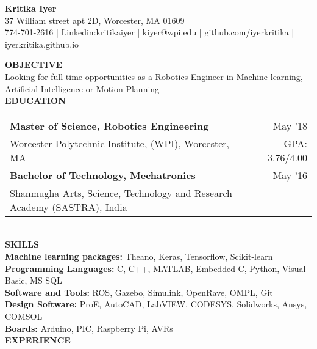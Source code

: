 \documentclass[10pt,a4paper]{article}
\begin{document}
\begin{center}

\textbf{\Large{Kritika Iyer}}\\
37 William street apt 2D, Worcester, MA 01609\\
774-701-2616 | Linkedin:kritikaiyer | kiyer@wpi.edu | github.com/iyerkritika | iyerkritika.github.io\\
\end{center}
\textbf{OBJECTIVE} \\
Looking for full-time opportunities as a Robotics Engineer in Machine learning, Artificial Intelligence or Motion Planning\\[1\baselineskip]
\textbf{EDUCATION}\\
\begin{tabular}{p{} r}
\textbf{Master of Science, Robotics Engineering} & May '18 \\
Worcester Polytechnic Institute, (WPI), Worcester, MA & GPA: 3.76/4.00 \\[1ex]
\textbf{Bachelor of Technology, Mechatronics} & May '16 \\
Shanmugha Arts, Science, Technology  and Research Academy (SASTRA), India
\end{tabular}
\\[1\baselineskip]
\textbf{SKILLS}\\
\textbf{Machine learning packages:} Theano, Keras, Tensorflow, Scikit-learn\\
\textbf{Programming Languages:} C, C++, MATLAB, Embedded C, Python, Visual Basic, MS SQL\\
\textbf{Software and Tools:} ROS, Gazebo, Simulink, OpenRave, OMPL, Git\\
\textbf{Design Software:} ProE, AutoCAD, LabVIEW, CODESYS, Solidworks, Ansys, COMSOL\\
\textbf{Boards:} Arduino, PIC, Raspberry Pi, AVRs\\[1\baselineskip]
\textbf{EXPERIENCE}\\
\end{document}
